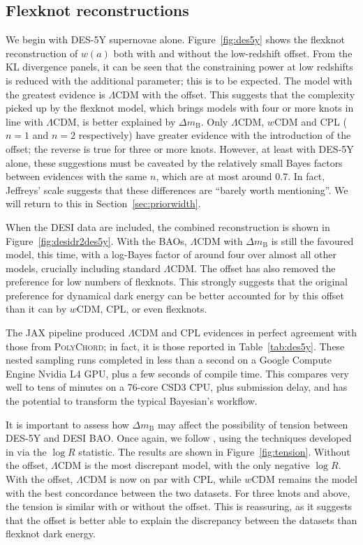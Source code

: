 \documentclass[fleqn,usenatbib]{mnras}
\newcommand{\lcdm}{$\Lambda$CDM}
\newcommand{\dmb}{\ensuremath{\Delta m_\mathrm B}}
\begin{document}
    \subsection{Flexknot reconstructions}
    We begin with DES-5Y supernovae alone.
    Figure~\ref{fig:des5y} shows the flexknot reconstruction of $w(a)$ both with and without the low-redshift offset.
    From the KL divergence panels, it can be seen that the constraining power at low redshifts is reduced with the additional parameter; this is to be expected.
    The model with the greatest evidence is \lcdm{} with the offset.
    This suggests that the complexity picked up by the flexknot model, which brings models with four or more knots in line with \lcdm{}, is better explained by \dmb{}.
    Only \lcdm{}, $w$CDM and CPL ($n=1$ and $n=2$ respectively) have greater evidence with the introduction of the offset; the reverse is true for three or more knots.
    However, at least with DES-5Y alone, these suggestions must be caveated by the relatively small Bayes factors between evidences with the same $n$, which are at most around $0.7$.
    In fact, Jeffreys' scale suggests that these differences are ``barely worth mentioning''.
    We will return to this in Section~\ref{sec:priorwidth}.

    When the DESI data are included, the combined reconstruction is shown in Figure~\ref{fig:desidr2des5y}.
    With the BAOs, \lcdm{} with \dmb{} is still the favoured model, this time, with a log-Bayes factor of around four over almost all other models, crucially including standard \lcdm{}.
    The offset has also removed the preference for low numbers of flexknots.
    This strongly suggests that the original preference for dynamical dark energy can be better accounted for by this offset than it can by $w$CDM, CPL, or even flexknots.

    The \textsc{JAX} pipeline produced \lcdm{} and CPL evidences in perfect agreement with those from \textsc{PolyChord}; in fact, it is those reported in Table~\ref{tab:des5y}.
    These nested sampling runs completed in less than a second on a Google Compute Engine Nvidia L4 GPU, plus a few seconds of compile time.
    This compares very well to tens of minutes on a 76-core CSD3 CPU, plus submission delay, and has the potential to transform the typical Bayesian's workflow.

    It is important to assess how \dmb{} may affect the possibility of tension between DES-5Y and DESI BAO.
    Once again, we follow \cite{paper1}, using the techniques developed in \cite{lemos, hergt, balancingact} via the $\log R$ statistic.
    The results are shown in Figure~\ref{fig:tension}.
    Without the offset, \lcdm{} is the most discrepant model, with the only negative $\log R$.
    With the offset, \lcdm{} is now on par with CPL, while $w$CDM remains the model with the best concordance between the two datasets.
    For three knots and above, the tension is similar with or without the offset.
    This is reassuring, as it suggests that the offset is better able to explain the discrepancy between the datasets than flexknot dark energy.
\end{document}
